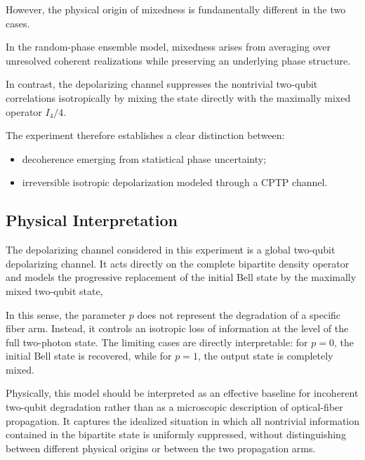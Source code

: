 However, the physical origin of mixedness is fundamentally different in the two cases.

In the random-phase ensemble model, mixedness arises from averaging over unresolved coherent realizations while preserving an underlying phase structure.

In contrast, the depolarizing channel suppresses the nontrivial two-qubit correlations isotropically by mixing the state directly with the maximally mixed operator \(I_4/4\).

The experiment therefore establishes a clear distinction between:

\begin{itemize}
    \item decoherence emerging from statistical phase uncertainty;
    \item irreversible isotropic depolarization modeled through a CPTP channel.
\end{itemize}


\subsection*{Physical Interpretation}

The depolarizing channel considered in this experiment is a global two-qubit depolarizing channel. It acts directly on the complete bipartite density operator and models the progressive replacement of the initial Bell state by the maximally mixed two-qubit state,

In this sense, the parameter \( p \) does not represent the degradation of a specific fiber arm. Instead, it controls an isotropic loss of information at the level of the full two-photon state. The limiting cases are directly interpretable: for \( p=0 \), the initial Bell state is recovered, while for \( p=1 \), the output state is completely mixed.

\medskip

Physically, this model should be interpreted as an effective baseline for incoherent two-qubit degradation rather than as a microscopic description of optical-fiber propagation. It captures the idealized situation in which all nontrivial information contained in the bipartite state is uniformly suppressed, without distinguishing between different physical origins or between the two propagation arms.


